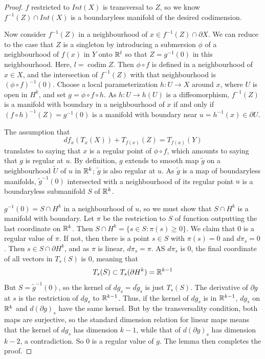 \begin{proof}
    $f$ restricted to $Int(X)$ is transversal to $Z$, so we know $f^{-1}(Z) \cap Int(X)$ is a boundaryless manifold of the desired codimension. 
    
    Now consider $f^{-1}(Z)$ in a neighbourhood of $x \in f^{-1}(Z) \cap \partial X$. We can reduce to the case that $Z$ is a singleton by introducing a submersion $\phi$ of a neighbourhood of $f(x)$ in $Y$ onto $\mathbb{R}^l$ so that $Z = g^{-1}(0)$ in this neighbourhood. Here, $l = \operatorname{codim}Z$. Then $\phi \circ f$ is defined in a neighbourhood of $x \in X$, and the intersection of $f^{-1}(Z)$ with that neighbourhood is $(\phi \circ f)^{-1}(0)$. Choose a local parameterization $h: U \to X$ around $x$, where $U$ is open in $H^k$, and set $g = \phi \circ f \circ h$. As $h: U \to h(U)$ is a diffeomorphism, $f^{-1}(Z)$ is a manifold with boundary in a neighbourhood of $x$ if and only if $(f \circ h)^{-1}(Z) = g^{-1}(0)$ is a manifold with boundary near $u = h^{-1}(x) \in \partial U$. 

    The assumption that 
    \[df_x(T_x(X)) + T_{f(x)}(Z) = T_{f(x)}(Y)\]
    translates to saying that $x$ is a regular point of $\phi \circ f$, which amounts to saying that $g$ is regular at $u$. By definition, $g$ extends to smooth map $\tilde{g}$ on a neighbourhood $\tilde{U}$ of $u$ in $\mathbb{R}^k$; $\tilde{g}$ is also regular at $u$. As $\tilde{g}$ is a map of boundaryless manifolds, $\tilde{g}^{-1}(0)$ intersected with a neighbourhood of its regular point $u$ is a boundaryless submanifold $S$ of $\mathbb{R}^k$. 

    $g^{-1}(0) = S \cap H^k$ in a neighbourhood of $u$, so we must show that $S \cap H^k$ is a manifold with boundary. Let $\pi$ be the restriction to $S$ of function outputting the last coordinate on $\mathbb{R}^k$. Then $S \cap H^k = \{s \in S : \pi(s) \geq 0\}$. We claim that 0 is a regular value of $\pi$. If not, then there is a point $s \in S$ with $\pi(s) = 0$ and $d\pi_s = 0$. Then $s \in S \cap \partial H^k$, and as $\pi$ is linear, $d\pi_s = \pi$. AS $d\pi_s$ is 0, the final coordinate of all vectors in $T_s(S)$ is 0, meaning that 
    \[T_s(S) \subset T_s(\partial H^k) = \mathbb{R}^{k-1}\]
    But $S = \tilde{g}^{-1}(0)$, so the kernel of $dg_s = d\tilde{g}_s$ is just $T_s(S)$. The derivative of $\partial g$ at $s$ is the restriction of $dg_s$ to $\mathbb{R}^{k-1}$. Thus, if the kernel of $dg_s$ is in $\mathbb{R}^{k-1}$, $dg_s$ on $\mathbb{R}^k$ and $d(\partial g)_s$ have the same kernel. But by the transversality condition, both maps are surjective, so the standard dimension relation for linear maps means that the kernel of $dg_s$ has dimension $k-1$, while that of $d(\partial g)_s$ has dimension $k-2$, a contradiction. So 0 is a regular value of $g$. The lemma then completes the proof. 
\end{proof}

